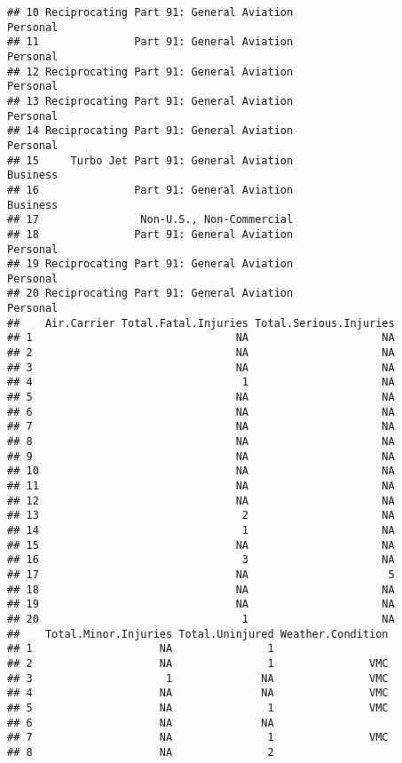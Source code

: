 \documentclass[]{article}
\begin{document}
\begin{verbatim}
## 10 Reciprocating Part 91: General Aviation                   Personal
## 11               Part 91: General Aviation                   Personal
## 12 Reciprocating Part 91: General Aviation                   Personal
## 13 Reciprocating Part 91: General Aviation                   Personal
## 14 Reciprocating Part 91: General Aviation                   Personal
## 15     Turbo Jet Part 91: General Aviation                   Business
## 16               Part 91: General Aviation                   Business
## 17                Non-U.S., Non-Commercial                           
## 18               Part 91: General Aviation                   Personal
## 19 Reciprocating Part 91: General Aviation                   Personal
## 20 Reciprocating Part 91: General Aviation                   Personal
##    Air.Carrier Total.Fatal.Injuries Total.Serious.Injuries
## 1                                NA                     NA
## 2                                NA                     NA
## 3                                NA                     NA
## 4                                 1                     NA
## 5                                NA                     NA
## 6                                NA                     NA
## 7                                NA                     NA
## 8                                NA                     NA
## 9                                NA                     NA
## 10                               NA                     NA
## 11                               NA                     NA
## 12                               NA                     NA
## 13                                2                     NA
## 14                                1                     NA
## 15                               NA                     NA
## 16                                3                     NA
## 17                               NA                      5
## 18                               NA                     NA
## 19                               NA                     NA
## 20                                1                     NA
##    Total.Minor.Injuries Total.Uninjured Weather.Condition
## 1                    NA               1                  
## 2                    NA               1               VMC
## 3                     1              NA               VMC
## 4                    NA              NA               VMC
## 5                    NA               1               VMC
## 6                    NA              NA                  
## 7                    NA               1               VMC
## 8                    NA               2                  

\end{verbatim}
\end{document}

